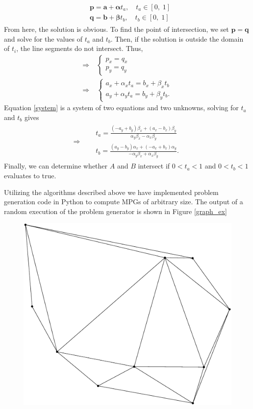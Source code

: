 \documentclass{article}
\newcommand{\ve}[1]{\boldsymbol{\mathbf{#1}}}
\begin{document}
\begin{multicols}{2}
\begin{align}
\begin{split}
		& \ve{p} = \ve{a} + \ve{\alpha} t_a, \quad t_a \in [0, \; 1]\\
		& \ve{q} = \ve{b} + \ve{\beta} t_b, \quad t_b \in [0, \; 1]
	\end{split}
\end{align}
From here, the solution is obvious. To find the point of intersection, we set $\ve{p} = \ve{q}$ and solve for the values of $t_a$ and $t_b$. Then, if the solution is outside the domain of $t_i$, the line segments do not intersect. Thus,
\begin{align}
	\Rightarrow \; &\begin{cases}
		p_x = q_x \\
		p_y = q_y
	\end{cases} \\
	\Rightarrow \; & \begin{cases}
		a_x + \alpha_x t_a = b_x + \beta_x t_b \\
		a_y + \alpha_y t_a = b_y + \beta_y t_b.
	\end{cases} \label{system}	
\end{align}
Equation \ref{system} is a system of two equations and two unknowns, solving for $t_a$ and $t_b$ gives
\begin{align}
	\Rightarrow \; & \begin{split}
		&t_a = \frac{(-a_y + b_y)\beta_x + (a_x - b_x)\beta_y}{\alpha_y \beta_x - \alpha_x \beta_y} \\
		&t_b = \frac{(a_y - b_y)\alpha_x + (-a_x + b_x)\alpha_y}{-\alpha_y \beta_x + \alpha_x \beta_y}.
	\end{split}
\end{align}
Finally, we can determine whether $A$ and $B$ intersect if $0 < t_a < 1$ and $0 < t_b < 1$ evaluates to true. \par
Utilizing the algorithms described above we have implemented problem generation code in Python to compute MPGs of arbitrary size. The output of a random execution of the problem generator is shown in Figure \ref{graph_ex}
\begin{figure}[H]
	\centering
	\includegraphics[trim={0 4cm 0 0.5cm},clip,width=0.9\linewidth]{images/graph_example}

\end{figure}
\end{multicols}
\end{document}
